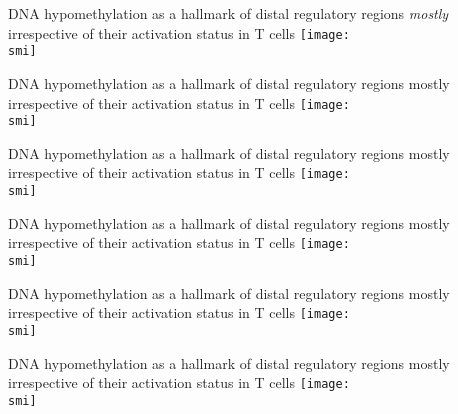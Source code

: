 \documentclass[10pt]{beamer}
\def\smi{out/ln/updir/mw-gcthesis-oral/library.bib}
\begin{document}
    \begin{frame}{DNA hypomethylation as a hallmark of distal regulatory regions \emph{mostly} irrespective of their activation status in T cells}
      \def\smi{out/ln/updir/mw-gcthesis-oral/ink/h3k27ac-clusters/1.pdf}
      \texttt{[image: \\smi]}%
    \end{frame}
    \begin{frame}{DNA hypomethylation as a hallmark of distal regulatory regions mostly irrespective of their activation status in T cells}
      \def\smi{out/ln/updir/mw-gcthesis-oral/ink/h3k27ac-clusters/2.pdf}
      \texttt{[image: \\smi]}
    \end{frame}
    \begin{frame}{DNA hypomethylation as a hallmark of distal regulatory regions mostly irrespective of their activation status in T cells}
      \def\smi{out/ln/updir/mw-gcthesis-oral/ink/h3k27ac-clusters/3.pdf}
      \texttt{[image: \\smi]}
    \end{frame}
    \begin{frame}{DNA hypomethylation as a hallmark of distal regulatory regions mostly irrespective of their activation status in T cells}
      \def\smi{out/ln/updir/mw-gcthesis-oral/ink/h3k27ac-clusters/4.pdf}
      \texttt{[image: \\smi]}
    \end{frame}
    \begin{frame}{DNA hypomethylation as a hallmark of distal regulatory regions mostly irrespective of their activation status in T cells}
      \def\smi{out/ln/updir/mw-gcthesis-oral/ink/h3k27ac-clusters/5.pdf}
      \texttt{[image: \\smi]}
    \end{frame}
    \begin{frame}{DNA hypomethylation as a hallmark of distal regulatory regions mostly irrespective of their activation status in T cells}
      \def\smi{out/ln/updir/mw-gcthesis-oral/ink/chromatin-states/genome-view/enhancers/1.pdf}
      \texttt{[image: \\smi]}
    \end{frame}
\end{document}
